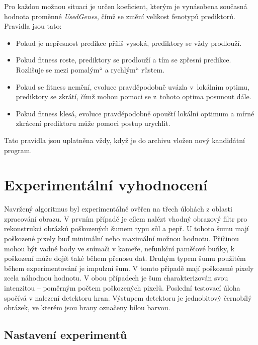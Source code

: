 \documentclass[fleqn,11pt]{ExcelAtFIT} %
\newcommand{\uv}[1]{\quotedblbase #1\textquotedblleft}
\begin{document}
Pro každou možnou situaci je určen koeficient, kterým je vynásobena současná hodnota proměnné \emph{UsedGenes}, čímž se změní velikost fenotypů prediktorů. Pravidla jsou tato:

\begin{itemize}
    \item Pokud je nepřesnost predikce příliš vysoká, prediktory se vždy prodlouží.
    \item Pokud fitness roste, prediktory se prodlouží a tím se zpřesní predikce. Rozlišuje se mezi \uv{pomalým} a \uv{rychlým} růstem.
    \item Pokud se fitness nemění, evoluce pravděpodobně uvázla v~lokálním optimu, prediktory se zkrátí, čímž mohou pomoci se z~tohoto optima posunout dále.
    \item Pokud fitness klesá, evoluce pravděpodobně opouští lokální optimum a mírné zkrácení prediktoru může pomoci postup urychlit.
\end{itemize}


Tato pravidla jsou uplatněna vždy, když je do archivu vložen nový kandidátní program.


\section{Experimentální vyhodnocení}
\label{sec:Experimental}

Navržený algoritmus byl experimentálně ověřen na třech úlohách z oblasti zpracování obrazu. V prvním případě je cílem nalézt vhodný obrazový filtr pro rekonstrukci obrázků poškozených šumem typu sůl a pepř. U tohoto šumu mají poškozené pixely buď minimální nebo maximální možnou hodnotu. Příčinou mohou být vadné body ve snímači v kameře, nefunkční paměťové buňky, k poškození může dojít také během přenosu dat. Druhým typem šumu použitém během experimentování je impulzní šum. V tomto případě mají poškozené pixely zcela náhodnou hodnotu. V obou případech je šum charakterizován svou intenzitou -- poměrným počtem poškozených pixelů. Poslední testovací úloha spočívá v nalezení detektoru hran. Výstupem detektoru je jednobitový černobílý obrázek, ve kterém jsou hrany označeny bílou barvou.

\subsection{Nastavení experimentů}
\end{document}
